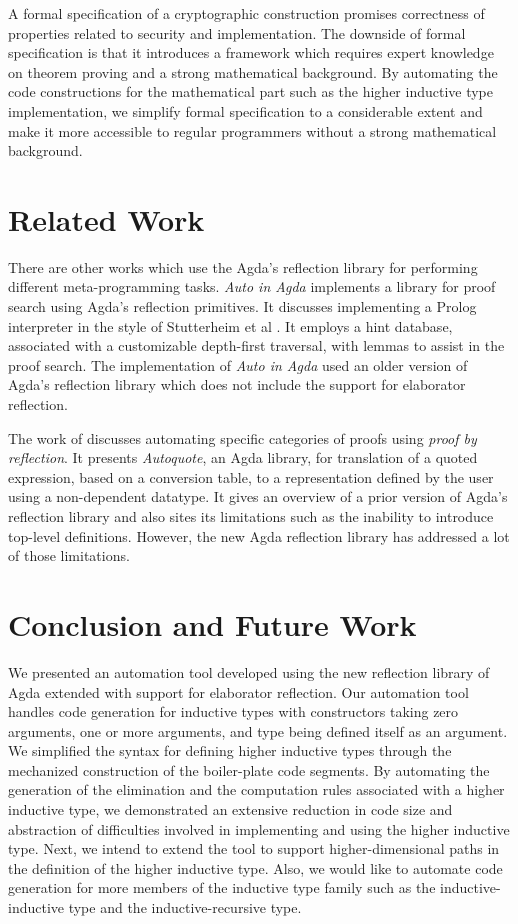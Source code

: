 \documentclass[sigplan,10pt]{acmart}
\begin{document}
A formal specification of a cryptographic construction promises correctness of properties related to security and implementation. The downside of formal specification is that it introduces a framework which requires expert knowledge on theorem proving and a strong mathematical background. By automating the code constructions for the mathematical part such as the higher inductive type implementation, we simplify formal specification to a considerable extent and make it more accessible to regular programmers without a strong mathematical background.

\section{Related Work}

There are other works which use the Agda's reflection library for performing different meta-programming tasks. \emph{Auto in Agda} \cite{Kokke-2015} implements a library for proof search using Agda's reflection primitives. It discusses implementing a Prolog interpreter in the style of Stutterheim et al \cite{Stutterheim-2013}. It employs a hint database, associated with a customizable depth-first traversal, with lemmas to assist in the proof search. The implementation of \emph{Auto in Agda} used an older version of Agda's reflection library which does not include the support for elaborator reflection. 

The work of \cite{Walt-2013} \cite{Walt-2012} discusses automating specific categories of proofs using \emph{proof by reflection}. It presents \emph{Autoquote}, an Agda library, for translation of a quoted expression, based on a conversion table, to a representation defined by the user using a non-dependent datatype. It gives an overview of a prior version of Agda's reflection library and also sites its limitations such as the inability to introduce top-level definitions. However, the new Agda reflection library has addressed a lot of those limitations.

\section{Conclusion and Future Work}

We presented an automation tool developed using the new reflection library of Agda extended with support for elaborator reflection. Our automation tool handles code generation for inductive types with constructors taking zero arguments, one or more arguments, and type being defined itself as an argument. We simplified the syntax for defining higher inductive types through the mechanized construction of the boiler-plate code segments. By automating the generation of the elimination and the computation rules associated with a higher inductive type, we demonstrated an extensive reduction in code size and abstraction of difficulties involved in implementing and using the higher inductive type. Next, we intend to extend the tool to support higher-dimensional paths in the definition of the higher inductive type. Also, we would like to automate code generation for more members of the inductive type family such as the inductive-inductive type and the inductive-recursive type.




\end{document}

